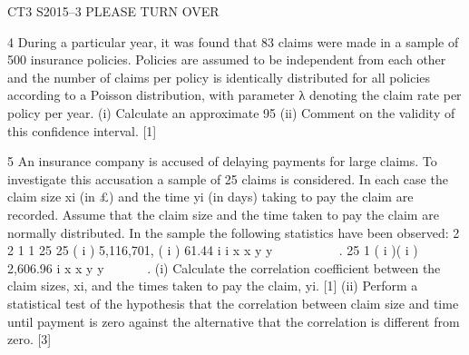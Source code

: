 \documentclass[a4paper,12pt]{article}
\begin{document}
\begin{enumerate}
CT3 S2015–3 PLEASE TURN OVER

  
4 During a particular year, it was found that 83 claims were made in a sample of 500
insurance policies. Policies are assumed to be independent from each other and the
number of claims per policy is identically distributed for all policies according to a
Poisson distribution, with parameter λ denoting the claim rate per policy per year.
(i) Calculate an approximate 95%
(ii) Comment on the validity of this confidence interval. [1]

  
5 An insurance company is accused of delaying payments for large claims. To
investigate this accusation a sample of 25 claims is considered. In each case the
claim size xi (in £) and the time yi (in days) taking to pay the claim are recorded.
Assume that the claim size and the time taken to pay the claim are normally
distributed. In the sample the following statistics have been observed:
  2 2
1 1
25 25
( i ) 5,116,701, ( i ) 61.44
i i
x x y y
 
      .
25
1
( i )( i ) 2,606.96
i
x x y y

    .
(i) Calculate the correlation coefficient between the claim sizes, xi, and the times
taken to pay the claim, yi. [1]
(ii) Perform a statistical test of the hypothesis that the correlation between claim
size and time until payment is zero against the alternative that the correlation
is different from zero. [3]


\end{enumerate}
\end{document}
